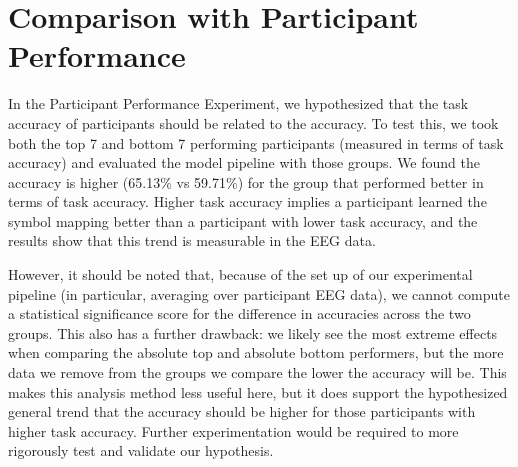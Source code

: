 \section{Comparison with Participant Performance}
In the Participant Performance Experiment, we hypothesized that the task 
accuracy of participants should be related to the \tvt accuracy. To test this, 
we took both the top 7 and bottom 7 performing participants (measured in terms 
of task accuracy) and evaluated the model pipeline with those groups. We found 
the \tvt accuracy is higher (65.13\% vs 59.71\%) for the group that performed 
better in terms of task accuracy. Higher task accuracy implies a participant 
learned the symbol mapping better than a participant with lower task accuracy, 
and the \tvt results show that this trend is measurable in the EEG data.  

However, it should be noted that, because of the set up of our experimental 
pipeline (in particular, averaging over participant EEG data), we cannot 
compute a statistical significance score for the difference in \tvt accuracies 
across the two groups. This also has a further drawback: we likely see the most 
extreme effects when comparing the absolute top and absolute bottom performers, 
but the more data we remove from the groups we compare the lower the \tvt 
accuracy will be. This makes this analysis method less useful here, but it does 
support the hypothesized general trend that the \tvt accuracy should be higher 
for those participants with higher task accuracy. Further experimentation would 
be required to more rigorously test and validate our hypothesis.
